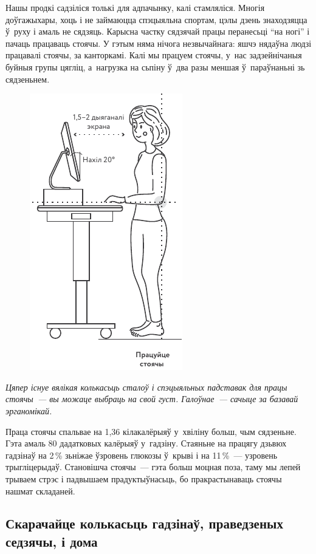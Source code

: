 Нашы продкі садзіліся толькі для адпачынку, калі стамляліся. Многія доўгажыхары, хоць і не займаюцца спэцыяльна спортам, цэлы дзень знаходзяцца ў~руху і амаль не сядзяць. Карысна частку сядзячай працы перанесьці ``на ногі'' і пачаць працаваць стоячы. У гэтым няма нічога незвычайнага: яшчэ нядаўна людзі працавалі стоячы, за канторкамі. Калі мы працуем стоячы, у~нас задзейнічаныя буйныя групы цягліц, а~нагрузка на сьпіну ў~два разы меншая ў~параўнаньні зь сядзеньнем.

\begin{figure}[htb!]
  \centering
  \includegraphics[scale=1.5]{willpower/ch5/5.pdf}
\end{figure}

\emph{Цяпер існуе вялікая колькасьць сталоў і спэцыяльных падставак для працы стоячы~--- вы можаце выбраць на свой густ. Галоўнае~--- сачыце за базавай эрганомікай.}

Праца стоячы спальвае на 1,36 кілакалёрыяў у~хвіліну больш, чым сядзеньне. Гэта амаль 80 дадатковых калёрыяў у~гадзіну. Стаяньне на працягу дзьвюх гадзінаў на 2\,\% зьніжае ўзровень глюкозы ў~крыві і на 11\,\%~--- узровень трыгліцерыдаў. Становішча стоячы~--- гэта больш моцная поза, таму мы лепей трываем стрэс і падвышаем прадуктыўнасьць, бо пракрастынаваць стоячы нашмат складаней.

\subsection*{Скарачайце колькасьць гадзінаў, праведзеных седзячы, і дома}

